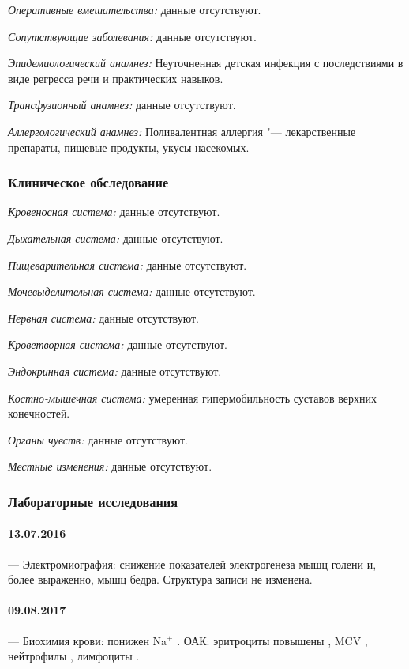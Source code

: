\documentclass[a4paper,14pt]{extarticle}
\newcommand{\pliter}{кл/л}
\newcommand{\mmolpl}{ммоль/л}
\newcommand{\fliter}{фл}
\begin{document}
\emph{Оперативные вмешательства:} данные отсутствуют.

\emph{Сопутствующие заболевания:} данные отсутствуют.

\emph{Эпидемиологический анамнез:} Неуточненная детская инфекция с последствиями в виде регресса речи и практических навыков.

\emph{Трансфузионный анамнез:} данные отсутствуют.

\emph{Аллергологический анамнез:} Поливалентная аллергия "--- лекарственные препараты, пищевые продукты, укусы насекомых.

\subsubsection*{Клиническое обследование}

\emph{Кровеносная система:} данные отсутствуют.

\emph{Дыхательная система:} данные отсутствуют.

\emph{Пищеварительная система:} данные отсутствуют.

\emph{Мочевыделительная система:} данные отсутствуют.

\emph{Нервная система:} данные отсутствуют.

\emph{Кроветворная система:} данные отсутствуют.

\emph{Эндокринная система:} данные отсутствуют.

\emph{Костно-мышечная система:} умеренная гипермобильность суставов верхних конечностей.

\emph{Органы чувств:} данные отсутствуют.

\emph{Местные изменения:} данные отсутствуют.

\subsubsection*{Лабораторные исследования}

\paragraph{13.07.2016} --- Электромиография: снижение показателей электрогенеза мышц голени и, более выраженно, мышц бедра. Структура записи не изменена.

\paragraph{09.08.2017} --- Биохимия крови: понижен Na$^{+}$ \numprint[\mmolpl]{135}. ОАК: эритроциты повышены \numprint[\pliter]{5.07e12}, MCV \numprint[\fliter]{73.8}, нейтрофилы , лимфоциты .
\end{document}
